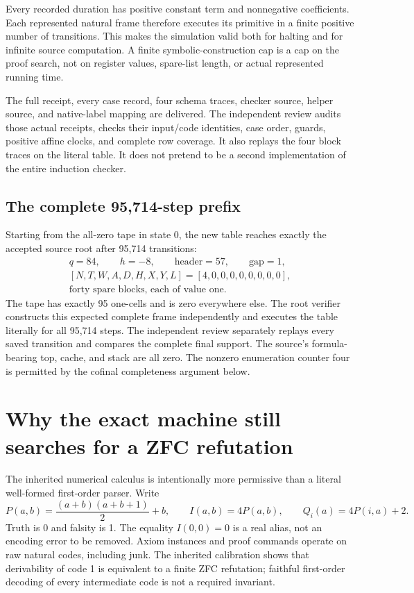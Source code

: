 \documentclass[11pt]{article}
\begin{document}
Every recorded duration has positive constant term and nonnegative
coefficients. Each represented natural frame therefore executes its
primitive in a finite positive number of transitions. This makes the
simulation valid both for halting and for infinite source computation.
A finite symbolic-construction cap is a cap on the proof search, not on
register values, spare-list length, or actual represented running time.

The full receipt, every case record, four schema traces, checker source,
helper source, and native-label mapping are delivered. The independent
review audits those actual receipts, checks their input/code identities,
case order, guards, positive affine clocks, and complete row coverage.
It also replays the four block traces on the literal table. It does not
pretend to be a second implementation of the entire induction checker.

\subsection{The complete 95,714-step prefix}

Starting from the all-zero tape in state 0, the new table reaches exactly
the accepted source root after 95,714 transitions:
\[
\begin{gathered}
q=84,\qquad h=-8,\qquad \text{header}=57,\qquad\text{gap}=1,\\
[N,T,W,A,D,H,X,Y,L]=[4,0,0,0,0,0,0,0,0],\\
\text{forty spare blocks, each of value one.}
\end{gathered}
\]
The tape has exactly 95 one-cells and is zero everywhere else. The root
verifier constructs this expected complete frame independently and
executes the table literally for all 95,714 steps. The independent
review separately replays every saved transition and compares the
complete final support. The source's formula-bearing top, cache, and
stack are all zero. The nonzero enumeration counter four is permitted
by the cofinal completeness argument below.

\section{Why the exact machine still searches for a ZFC refutation}
\label{sec:logical}

The inherited numerical calculus is intentionally more permissive than
a literal well-formed first-order parser. Write
\[
 P(a,b)=\frac{(a+b)(a+b+1)}2+b,\qquad
 I(a,b)=4P(a,b),\qquad Q_i(a)=4P(i,a)+2.
\]
Truth is 0 and falsity is 1. The equality $I(0,0)=0$ is a real alias,
not an encoding error to be removed. Axiom instances and proof commands
operate on raw natural codes, including junk. The inherited calibration
shows that derivability of code 1 is equivalent to a finite ZFC
refutation; faithful first-order decoding of every intermediate code is
not a required invariant.
\end{document}
